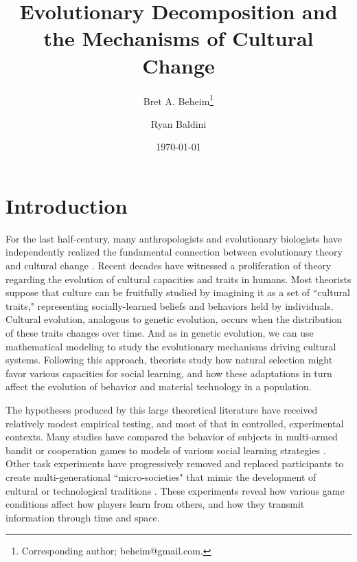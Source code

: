 \documentclass[11pt]{article}
\title{Evolutionary Decomposition and the Mechanisms of Cultural Change}
\author[,    1]{Bret A. Beheim\footnote{Corresponding author; beheim@gmail.com.}}
\author[1]{Ryan Baldini}
\affil[1]{Graduate Group in Ecology, Department of Environmental Science and Policy, University of California, Davis, USA}
\date{\today}
\begin{document}
\maketitle

\setlength{\parindent}{30pt}
\section{Introduction}
   
For the last half-century, many anthropologists and evolutionary biologists have independently realized the fundamental connection between evolutionary theory and cultural change \citep{campbell1965variation, cavalli1981cultural, boyd1985culture, durham1992coevolution, lumsden2005genes, dawkins2006selfish}. Recent decades have witnessed a proliferation of theory regarding the evolution of cultural capacities and traits in humans. Most theorists suppose that culture can be fruitfully studied by imagining it as a set of ``cultural traits," representing socially-learned beliefs and behaviors held by individuals. Cultural evolution, analogous to genetic evolution, occurs when the distribution of these traits changes over time. And as in genetic evolution, we can use mathematical modeling to study the evolutionary mechanisms driving cultural systems. Following this approach, theorists study how natural selection might favor various capacities for social learning, and how these adaptations in turn affect the evolution of behavior and material technology in a population. 

The hypotheses produced by this large theoretical literature have received relatively modest empirical testing, and most of that in controlled, experimental contexts. Many studies have compared the behavior of subjects in multi-armed bandit or cooperation games to models of various social learning strategies \citep{mcelreath2005applying, efferson2007learning, efferson2008conformists, mcelreath2008beyond, mesoudi2008cultural, eriksson2009people, rendell2011copying}. Other task experiments have progressively removed and replaced participants to create multi-generational ``micro-societies" that mimic the development of cultural or technological traditions \citep{baum2004cultural, caldwell2008studying}.  These experiments reveal how various game conditions affect how players learn from others, and how they transmit information through time and space.
\end{document}
